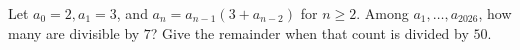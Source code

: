 Let $a_0=2,a_1=3$, and $a_n=a_{n-1}(3+a_{n-2})$ for $n\ge2$. Among $a_1,\ldots,a_{2026}$, how many are divisible by $7$? Give the remainder when that count is divided by $50$.
